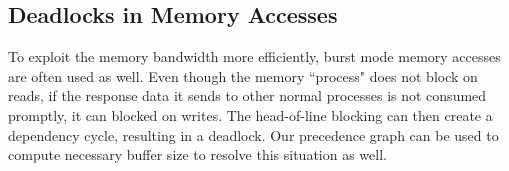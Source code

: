 \documentclass{sig-alternate}
\begin{document}

\subsection{Deadlocks in Memory Accesses}
To exploit the memory bandwidth more efficiently, burst mode memory accesses are often used as well. Even though the memory ``process" does not block on reads, if the response data it sends to other normal processes is not consumed promptly, it can blocked on writes. 
The head-of-line blocking can then create a dependency cycle, resulting in a deadlock. Our precedence graph can be used to compute necessary buffer size to resolve this situation as well.
\end{document}
